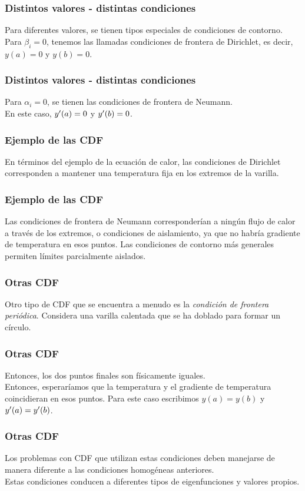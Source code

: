 \documentclass[12pt]{beamer}
\begin{document}
\begin{frame}
\frametitle{Distintos valores - distintas condiciones}
Para diferentes valores, se tienen tipos especiales de condiciones de contorno.
\\
\bigskip
\pause
Para $\beta_{i} = 0$, tenemos las llamadas condiciones de frontera de Dirichlet, es decir, $y (a) = 0$ y $y (b) = 0$.
\end{frame}
\begin{frame}
\frametitle{Distintos valores - distintas condiciones}
Para $\alpha_{i} = 0$, se tienen las condiciones de frontera de Neumann.
\\
\bigskip
\pause
En este caso, ${y}^{\prime} (a) = 0$ y ${y}^{\prime} (b) = 0$.
\end{frame}
\begin{frame}
\frametitle{Ejemplo de las CDF}
En términos del ejemplo de la ecuación de calor, las condiciones de Dirichlet corresponden a mantener una temperatura fija en los extremos de la varilla.
\end{frame}
\begin{frame}
\frametitle{Ejemplo de las CDF}
Las condiciones de frontera de Neumann corresponderían a ningún flujo de calor a través de los extremos, o condiciones de aislamiento, ya que no habría gradiente de temperatura en esos puntos. \pause Las condiciones de contorno más generales permiten límites parcialmente aislados.
\end{frame}
\begin{frame}
\frametitle{Otras CDF}
Otro tipo de CDF que se encuentra a menudo es la \emph{condición de frontera periódica}.
\pause
Considera una varilla calentada que se ha doblado para formar un círculo.
\end{frame}
\begin{frame}
\frametitle{Otras CDF}
Entonces, los dos puntos finales son físicamente iguales. 
 \\
 \bigskip
 \pause
 Entonces, esperaríamos que la temperatura y el gradiente de temperatura coincidieran en esos puntos. Para este caso escribimos $y (a) = y (b)$ y ${y}^{\prime} (a) = {y}^{\prime} (b)$.
\end{frame}
\begin{frame}
\frametitle{Otras CDF}
Los problemas con CDF que utilizan estas condiciones deben manejarse de manera diferente a las condiciones homogéneas anteriores.
\\
\bigskip
\pause
Estas condiciones conducen a diferentes tipos de eigenfunciones y valores propios.
\end{frame}
\end{document}
